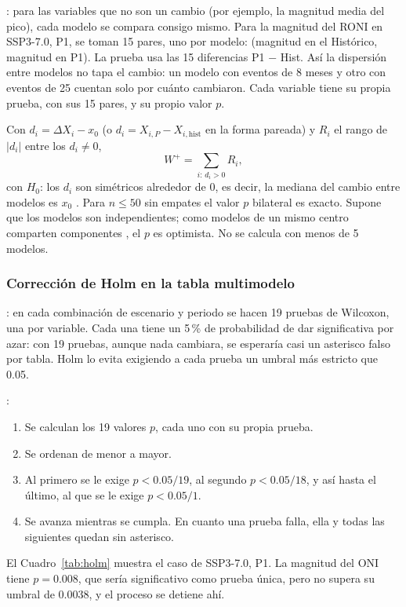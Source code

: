 \documentclass[11pt,a4paper]{article}
\begin{document}
: para las variables que no son un cambio (por ejemplo, la magnitud media del pico), cada modelo se compara consigo mismo.
Para la magnitud del RONI en SSP3-7.0, P1, se toman 15 pares, uno por modelo: (magnitud en el Histórico, magnitud en P1).
La prueba usa las 15 diferencias P1 $-$ Hist.
Así la dispersión entre modelos no tapa el cambio: un modelo con eventos de 8 meses y otro con eventos de 25 cuentan solo por cuánto cambiaron.
Cada variable tiene su propia prueba, con sus 15 pares, y su propio valor $p$.

Con $d_i = \Delta X_i - x_0$ (o $d_i = X_{i,P} - X_{i,\mathrm{hist}}$ en la forma pareada) y $R_i$ el rango de $|d_i|$ entre los $d_i \neq 0$,
\begin{equation}
\label{eq:wilcoxon}
W^{+} = \sum_{i:\, d_i > 0} R_i ,
\end{equation}
con $H_0$: los $d_i$ son simétricos alrededor de 0, es decir, la mediana del cambio entre modelos es $x_0$ \citep{wilcoxon1945}.
Para $n \le 50$ sin empates el valor $p$ bilateral es exacto.
Supone que los modelos son independientes; como modelos de un mismo centro comparten componentes \citep{eyring2019}, el $p$ es optimista.
No se calcula con menos de 5 modelos.

\subsubsection{Corrección de Holm en la tabla multimodelo}
\label{sec:holm}

: en cada combinación de escenario y periodo se hacen 19 pruebas de Wilcoxon, una por variable.
Cada una tiene un 5\,\% de probabilidad de dar significativa por azar: con 19 pruebas, aunque nada cambiara, se esperaría casi un asterisco falso por tabla.
Holm lo evita exigiendo a cada prueba un umbral más estricto que 0.05.

: 
\begin{enumerate}[nosep,leftmargin=*]
\item Se calculan los 19 valores $p$, cada uno con su propia prueba.
\item Se ordenan de menor a mayor.
\item Al primero se le exige $p < 0.05/19$, al segundo $p < 0.05/18$, y así hasta el último, al que se le exige $p < 0.05/1$.
\item Se avanza mientras se cumpla. En cuanto una prueba falla, ella y todas las siguientes quedan sin asterisco.
\end{enumerate}
El Cuadro~\ref{tab:holm} muestra el caso de SSP3-7.0, P1.
La magnitud del ONI tiene $p = 0.008$, que sería significativo como prueba única, pero no supera su umbral de 0.0038, y el proceso se detiene ahí.
\end{document}
